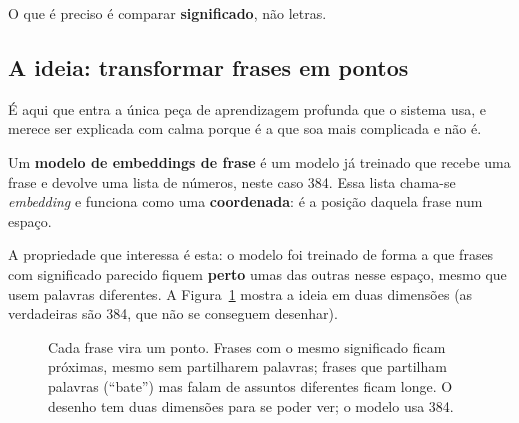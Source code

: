 O que é preciso é comparar \textbf{significado}, não letras.

\subsection{A ideia: transformar frases em pontos}

É aqui que entra a única peça de aprendizagem profunda que o sistema usa, e merece ser explicada com
calma porque é a que soa mais complicada e não é.

Um \textbf{modelo de embeddings de frase} \autocite{reimers2019sbert} é um modelo já treinado que
recebe uma frase e devolve uma lista de números, neste caso 384. Essa lista chama-se
\emph{embedding} e funciona como uma \textbf{coordenada}: é a posição daquela frase num espaço.

A propriedade que interessa é esta: o modelo foi treinado de forma a que frases com significado
parecido fiquem \textbf{perto} umas das outras nesse espaço, mesmo que usem palavras diferentes. A
Figura~\ref{fig:embeddings} mostra a ideia em duas dimensões (as verdadeiras são 384, que não se
conseguem desenhar).

\begin{figure}[ht]
\centering
{}
\caption[Frases como pontos num espaço]{Cada frase vira um ponto. Frases com o mesmo significado
ficam próximas, mesmo sem partilharem palavras; frases que partilham palavras (``bate'') mas falam
de assuntos diferentes ficam longe. O desenho tem duas dimensões para se poder ver; o modelo usa
384.}
\label{fig:embeddings}
\end{figure}

